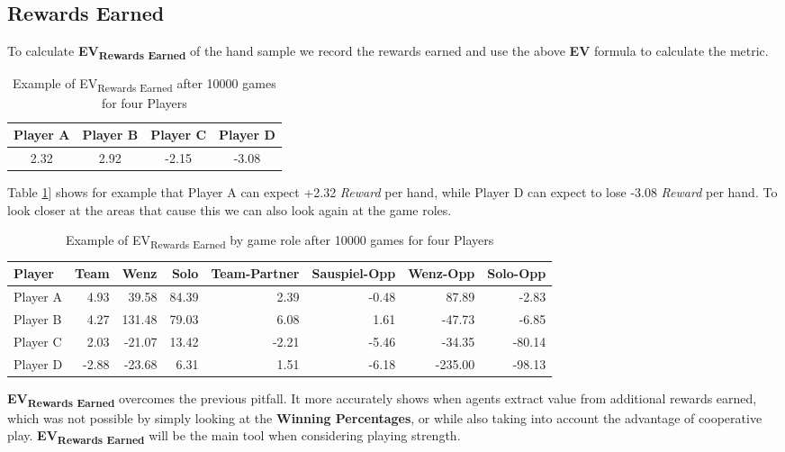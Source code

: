 \subsection{Rewards Earned}
To calculate \textbf{EV\textsubscript{Rewards Earned}} of the hand sample we record the rewards earned and use the
above \textbf{EV} formula to calculate the metric.
\newline
\begin{center}
\begin{table}[h!]
\begin{tabular}{cccc}
\toprule
Player A &  Player B &  Player C &  Player D\\
\midrule
2.32 &              2.92 &          -2.15 &          -3.08 \\
\bottomrule
\end{tabular}
\caption{Example of EV\textsubscript{Rewards Earned} after 10000 games for four Players}
\label{tab:EVrewardsOverall}
\end{table}
\end{center}
Table \ref{tab:EVrewardsOverall}] shows for example that Player A can expect +2.32 \textit{Reward} per hand, while
Player D can expect to lose -3.08 \textit{Reward} per hand.
To look closer at the areas that cause this we can also look again at the game roles.
\newline
\begin{center}
\begin{table}[h!]
\begin{tabular}{lrrrrrrr}
\toprule
Player &  Team &    Wenz &   Solo &  Team-Partner &  Sauspiel-Opp &  Wenz-Opp &  Solo-Opp \\
\midrule
Player A &  4.93 &   39.58 &  84.39 &          2.39 &         -0.48 &     87.89 &     -2.83 \\
Player B &  4.27 &  131.48 &  79.03 &          6.08 &          1.61 &    -47.73 &     -6.85 \\
Player C &  2.03 &  -21.07 &  13.42 &         -2.21 &         -5.46 &    -34.35 &    -80.14 \\
Player D & -2.88 &  -23.68 &   6.31 &          1.51 &         -6.18 &   -235.00 &    -98.13 \\
\bottomrule
\end{tabular}
    \caption{Example of EV\textsubscript{Rewards Earned} by game role after 10000 games for four Players}
\label{tab:EVrewardsGamemode}
\end{table}
\end{center}
\textbf{EV\textsubscript{Rewards Earned}} overcomes the previous pitfall.
It more accurately shows when agents extract value from additional rewards earned, which was not possible by simply
looking at the \textbf{Winning Percentages}, or while also taking into account the advantage of cooperative play.
\newline
\textbf{EV\textsubscript{Rewards Earned}} will be the main tool when considering playing strength.


